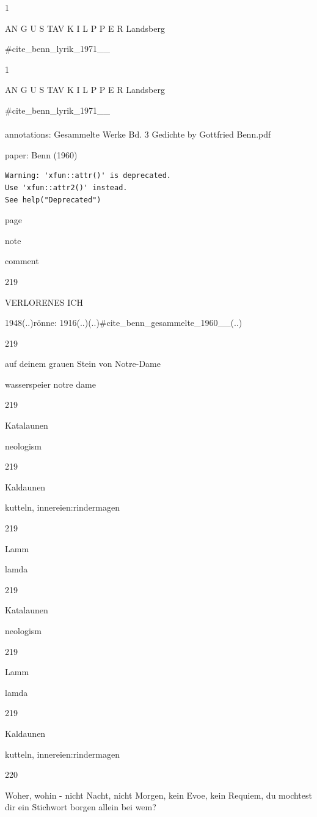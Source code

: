 \documentclass[
  letterpaper,
  DIV=11,
  numbers=noendperiod]{scrartcl}
\makeatletter
\let\oldparagraph\paragraph
\renewcommand{\paragraph}{
    \@ifstar
      \xxxParagraphStar
      \xxxParagraphNoStar
  }
\newcommand{\xxxParagraphStar}[1]{\oldparagraph*{#1}\mbox{}}
\newcommand{\xxxParagraphNoStar}[1]{\oldparagraph{#1}\mbox{}}
\makeatother
\begin{document}
1

AN G U S TAV K I L P P E R Landsberg

\#cite\_benn\_lyrik\_1971\_\_

1

AN G U S TAV K I L P P E R Landsberg

\#cite\_benn\_lyrik\_1971\_\_

\paragraph{annotations: Gesammelte Werke Bd. 3 Gedichte by Gottfried
Benn.pdf}\label{annotations-gesammelte-werke-bd.-3-gedichte-by-gottfried-benn.pdf}

paper: Benn (1960)

\begin{verbatim}
Warning: 'xfun::attr()' is deprecated.
Use 'xfun::attr2()' instead.
See help("Deprecated")
\end{verbatim}

page

note

comment

219

VERLORENES ICH

1948(..)rönne: 1916(..)(..)\#cite\_benn\_gesammelte\_1960\_\_(..)

219

auf deinem grauen Stein von Notre-Dame

wasserspeier notre dame

219

Katalaunen

neologism

219

Kaldaunen

kutteln, innereien:rindermagen

219

Lamm

lamda

219

Katalaunen

neologism

219

Lamm

lamda

219

Kaldaunen

kutteln, innereien:rindermagen

220

Woher, wohin - nicht Nacht, nicht Morgen, kein Evoe, kein Requiem, du
mochtest dir ein Stichwort borgen allein bei wem?
\end{document}

